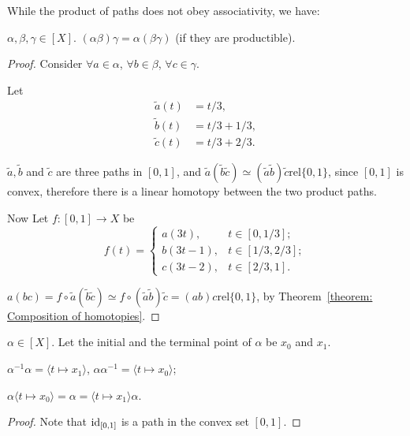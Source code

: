 \documentclass[openany, oneside, a5paper]{book}
\newcommand*{\rel}{\mathbin{\mathrm{rel}}}
\newcommand*{\pclass}[1]{\langle{#1}\rangle}    %
\begin{document}
While the product of paths does not obey associativity, we have:
\begin{theorem}%
    \label{theorem: Associativity of product of path classes}
    $\alpha, \beta, \gamma \in [X]$. $(\alpha \beta) \gamma = \alpha (\beta \gamma)$ (if they are productible).
\end{theorem}
\begin{proof}
    Consider $\forall a \in \alpha$, $\forall b \in \beta$, $\forall c \in \gamma$.

    Let
    \begin{align}
        \tilde a(t) &= t/3, \\
        \tilde b(t) &= t/3 + 1/3, \\
        \tilde c(t) &= t/3 + 2/3.
    \end{align}

    $\tilde a, \tilde b$ and $\tilde c$ are three paths in $[0, 1]$, and $\tilde a (\tilde b \tilde c) \simeq (\tilde a \tilde b) \tilde c \rel \{0, 1\}$, since $[0, 1]$ is convex, therefore there is a linear homotopy between the two product paths.

    Now Let $f \colon [0, 1] \to X$ be
    \begin{equation*}
        f(t) = \begin{cases}
            a(3t), & t \in [0, 1/3]; \\
            b(3t - 1), & t \in [1/3, 2/3]; \\
            c(3t - 2), & t \in [2/3, 1].
        \end{cases}
    \end{equation*}

    $a(bc) = f \circ \tilde a (\tilde b \tilde c) \simeq f \circ (\tilde a \tilde b) \tilde c = (ab)c \rel \{0, 1\}$, by Theorem~\ref{theorem: Composition of homotopies}.
\end{proof}

\begin{theorem}%
    \label{theorem: Identity-like properties of point path}
    $\alpha \in [X]$. 
    Let the initial and the terminal point of $\alpha$ be $x_0$ and $x_1$.
    \begin{enumerate*}[label=\emph{(\roman*)}] %
        \item $\alpha^{-1} \alpha = \pclass{t \mapsto x_1}$, $\alpha \alpha^{-1} = \pclass{t \mapsto x_0}$;
        \item $\alpha \pclass{t \mapsto x_0} = \alpha = \pclass{t \mapsto x_1}\alpha$.
    \end{enumerate*}
\end{theorem}
\begin{proof}
    Note that $\operatorname{id}_{[0, 1]}$ is a path in the convex set $[0, 1]$.
\end{proof}
\end{document}
